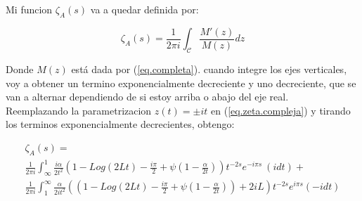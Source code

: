 Mi funcion $ \zeta _A (s) $ va a quedar definida por:

\begin{equation}
\zeta _A (s) = 
\frac{1}{2 \pi i} 
\int _{\mathcal{C}}
\frac{M ' ( z ) }{ M ( z ) } d z
\label{eq.zeta.compleja}
\end{equation}

Donde $M ( z )$ está dada por (\ref{eq.completa}).
cuando integre los ejes verticales, voy a obtener un termino exponencialmente decreciente y uno decreciente, que se van a alternar dependiendo de si estoy arriba o abajo del eje real. \\

Reemplazando la parametrizacion $ z (t) = \pm i t$ en (\ref{eq.zeta.compleja}) y tirando los terminos exponencialmente decrecientes, obtengo:

\begin{comment}

\begin{equation}
\begin{array}{c}
    \zeta _A (s) = \\
     \frac{1}{2 \pi i} \int _{\infty} ^{1}
     \frac{\beta}{2 t^2} 
     \left(
     1 - \frac{i \pi}{2} + Log[2 t] + \psi (1 + \frac{\beta}{2 t})
     \right)
     t ^{-2s}
     e ^{- i \pi s} (i dt) + \\
     \frac{1}{2 \pi i} \int _{\infty} ^{1} 
     \left(
     2 + \frac{\beta}{2 t^2}
     \left(
     1 + \frac{i \pi}{2} - Log[2 t] - \psi (1+ \frac{\beta}{2 t})
     \right)
     t ^{-2s}
     e ^{ i \pi s} (-i dt)
     \right)     
\end{array}
\end{equation}

\end{comment}

\begin{equation}
\begin{array}{c}
    \zeta _A (s) = \\
     \frac{1}{2 \pi i} \int _{\infty} ^{1}
     \frac{i \alpha}{2 t^2}
     \left(
     1 - Log(2 L t) - \frac{i \pi}{2} + \psi (1-\frac{\alpha}{2 t})
     \right)
     t^{-2 s}
     e^{-i \pi s} \ 
     (i dt) + \\
     \frac{1}{2 \pi i} \int _1 ^{\infty}
     \frac{ \alpha}{2 i t^2}
     \left(
     \left(
     1 - Log(2 L t) - \frac{i \pi}{2} + \psi (1-\frac{\alpha}{2 t}) 
     \right)
     + 2 i L
     \right)
     t^{-2 s}
     e^{i \pi s}
     (-i dt)
     
\end{array}
\end{equation}


